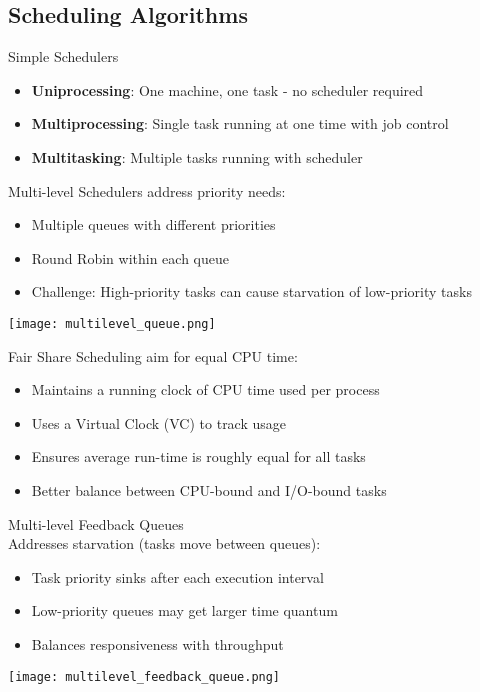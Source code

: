 \multend



\subsection{Scheduling Algorithms}


\begin{definition}{Simple Schedulers}
    \begin{itemize}
        \item \textbf{Uniprocessing}: One machine, one task - no scheduler required
        \item \textbf{Multiprocessing}: Single task running at one time with job control
        \item \textbf{Multitasking}: Multiple tasks running with scheduler
    \end{itemize}
\end{definition}

\begin{concept}{Multi-level Schedulers} address priority needs:
    \begin{itemize}
        \item Multiple queues with different priorities
        \item Round Robin within each queue
        \item Challenge: High-priority tasks can cause starvation of low-priority tasks
    \end{itemize}
    \texttt{[image: multilevel\_queue.png]}
\end{concept}

\begin{definition}{Fair Share Scheduling} aim for equal CPU time:
    \begin{itemize}
        \item Maintains a running clock of CPU time used per process
        \item Uses a Virtual Clock (VC) to track usage
        \item Ensures average run-time is roughly equal for all tasks
        \item Better balance between CPU-bound and I/O-bound tasks
    \end{itemize}
\end{definition}

\begin{concept}{Multi-level Feedback Queues} \\
    Addresses starvation (tasks move between queues):
    \begin{itemize}
        \item Task priority sinks after each execution interval
        \item Low-priority queues may get larger time quantum
        \item Balances responsiveness with throughput
    \end{itemize}
    \texttt{[image: multilevel\_feedback\_queue.png]}
\end{concept}



